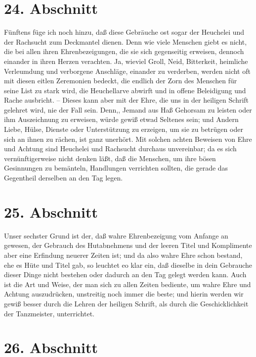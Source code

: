 \section{24. Abschnitt} \label{kap9_ab24}

Fünftens füge ich noch hinzu, daß diese Gebräuche ost sogar der Heuchelei und
der Rachsucht zum Deckmantel dienen. Denn wie viele Menschen giebt es nicht, die
bei allen ihren Ehrenbezeigungen, die sie sich gegenseitig erweisen, dennoch
einander in ihren Herzen verachten. Ja, wieviel Groll, Neid, Bitterkeit,
heimliche Verleumdung und verborgene Anschläge, einander zu verderben, werden
nicht oft mit diesen eitlen Zeremonien bedeckt, die endlich der Zorn des
Menschen für seine List zu stark wird, die Heuchellarve abwirft und in offene
Beleidigung und Rache ausbricht. -- Dieses kann aber mit der Ehre, die uns in
der heiligen Schrift gelehret wird, nie der Fall sein. Denn,, Jemand aus Haß
Gehorsam zu leisten oder ihm Auszeichnung zu erweisen, würde gewiß etwad
Seltenes sein; und Andern Liebe, Hülse, Dienste oder Unterstützung zu erzeigen,
um sie zu betrügen oder sich an ihnen zu rächen, ist ganz unerhört. Mit solchen
achten Beweisen von Ehre und Achtung sind Heuchelei und Rachsucht durchaus
unvereinbar; da es sich vernünftigerweise nicht denken läßt, daß die Menschen,
um ihre bösen Gesinnungen zu bemänteln, Handlungen verrichten sollten, die
gerade das Gegentheil derselben an den Tag legen.

\section{25. Abschnitt} \label{kap9_ab25}

Unser sechster Grund ist der, daß wahre Ehrenbezeigung vom Anfange an gewesen,
der Gebrauch des Hutabnehmens und der leeren Titel und Komplimente aber eine
Erfindung neuerer Zeiten ist; und da also wahre Ehre schon bestand, ehe es Hüte
und Titel gab, so leuchtet eo klar ein, daß dieselbe in dein Gebrauche dieser
Dinge nicht bestehen oder dadurch an den Tag gelegt werden kann. Auch ist die
Art und Weise, der man sich zu allen Zeiten bediente, um wahre Ehre und Achtung
auszudrücken, unstreitig noch immer die beste; und hierin werden wir gewiß
besser durch die Lehren der heiligen Schrift, als durch die Geschicklichkeit der
Tanzmeister,
unterrichtet.

\section{26. Abschnitt} \label{kap9_ab26}

